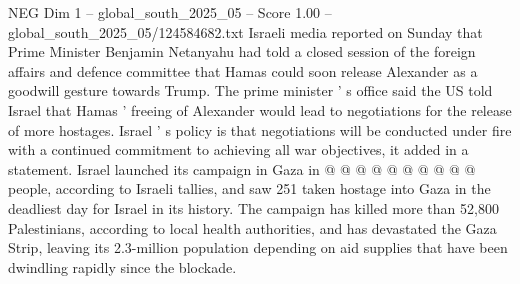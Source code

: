 \begin{textsample}{NEG Dim 1 – global\_south\_2025\_05 – Score 1.00 – global\_south\_2025\_05/124584682.txt}
Israeli media reported on Sunday that Prime Minister Benjamin Netanyahu had told a closed session of the foreign affairs and defence committee that Hamas could soon release Alexander as a goodwill gesture towards Trump.
The prime minister ' s office said the US told Israel that Hamas ' freeing of Alexander would lead to negotiations for the release of more hostages.
Israel ' s policy is that negotiations will be conducted under fire with a continued commitment to achieving all war objectives, it added in a statement.
Israel launched its campaign in Gaza in @ @ @ @ @ @ @ @ @ @ people, according to Israeli tallies, and saw 251 taken hostage into Gaza in the deadliest day for Israel in its history.
The campaign has killed more than 52,800 Palestinians, according to local health authorities, and has devastated the Gaza Strip, leaving its 2.3-million population depending on aid supplies that have been dwindling rapidly since the blockade.

\end{textsample}
